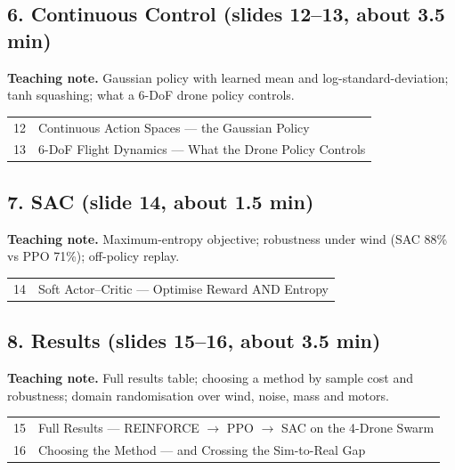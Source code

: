 \documentclass[11pt]{article}
\begin{document}
\subsection{6. Continuous Control \normalfont\small\color{GreyN}(slides 12--13, about 3.5 min)}

\textbf{Teaching note.} Gaussian policy with learned mean and log-standard-deviation; tanh squashing; what a 6-DoF drone policy controls.

\begin{center}\small\renewcommand{\arraystretch}{1.1}\begin{tabularx}{\textwidth}{@{}r X@{}}12 & Continuous Action Spaces --- the Gaussian Policy\\
13 & 6-DoF Flight Dynamics --- What the Drone Policy Controls\\\end{tabularx}\end{center}

\subsection{7. SAC \normalfont\small\color{GreyN}(slide 14, about 1.5 min)}

\textbf{Teaching note.} Maximum-entropy objective; robustness under wind (SAC 88\% vs PPO 71\%); off-policy replay.

\begin{center}\small\renewcommand{\arraystretch}{1.1}\begin{tabularx}{\textwidth}{@{}r X@{}}14 & Soft Actor--Critic --- Optimise Reward AND Entropy\\\end{tabularx}\end{center}

\subsection{8. Results \normalfont\small\color{GreyN}(slides 15--16, about 3.5 min)}

\textbf{Teaching note.} Full results table; choosing a method by sample cost and robustness; domain randomisation over wind, noise, mass and motors.

\begin{center}\small\renewcommand{\arraystretch}{1.1}\begin{tabularx}{\textwidth}{@{}r X@{}}15 & Full Results --- REINFORCE $\to$ PPO $\to$ SAC on the 4-Drone Swarm\\
16 & Choosing the Method --- and Crossing the Sim-to-Real Gap\\\end{tabularx}\end{center}
\end{document}
